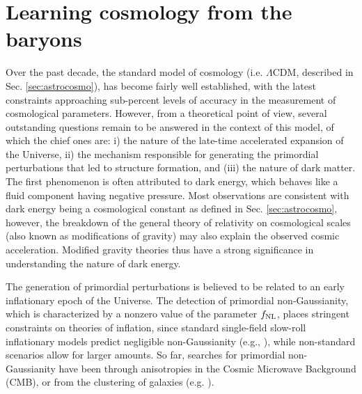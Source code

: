 


\section{Learning cosmology from the baryons}\label{s:forecasts}
Over the past decade, the standard model of cosmology (i.e. $\Lambda$CDM, described in Sec. \ref{sec:astrocosmo}), has become fairly well established, with the latest constraints approaching sub-percent levels of accuracy in the measurement of cosmological parameters. However, from a theoretical point of view, several outstanding questions remain to be answered in the context of this model, of which the chief ones are: i) the nature of the late-time accelerated expansion of the Universe,  ii) the mechanism responsible for generating the primordial perturbations that led to structure formation, and (iii) the nature of dark matter. The first phenomenon is often attributed to dark energy, which behaves like a fluid component having negative pressure. Most observations are consistent with dark energy being a cosmological constant as defined in Sec. \ref{sec:astrocosmo}, however, the breakdown of the general theory of relativity on cosmological scales (also known as modifications of gravity) may also explain the observed cosmic acceleration. Modified gravity theories thus have a strong significance in understanding the nature of dark energy.  

The generation of primordial perturbations is believed to be related to an early inflationary epoch of the Universe. The detection of primordial non-Gaussianity, which is characterized by a nonzero value of the parameter $f_{\rm NL}$, places stringent constraints on theories of inflation, since standard single-field slow-roll inflationary models predict negligible non-Gaussianity (e.g., \cite{Maldacena:2002vr}), while non-standard scenarios allow for larger amounts. So far, searches for primordial non-Gaussianity have been through anisotropies in the Cosmic Microwave Background (CMB), or from the clustering of galaxies (e.g. \cite{Giannantonio:2013uqa, castorina2019}).


